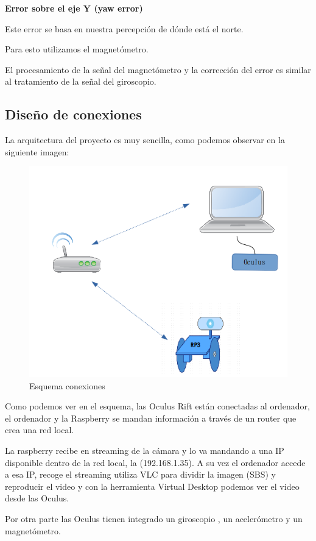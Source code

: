 \documentclass[twoside, 12pt]{epstfg}
\begin{document}
\newpage
\textbf{Error sobre el eje Y (yaw error)}

Este error se basa en nuestra percepción de dónde está el norte.

Para esto utilizamos el magnetómetro.

El procesamiento de la señal del magnetómetro y la corrección del error es similar al tratamiento de la señal del giroscopio.

\subsection{Diseño de conexiones}

La arquitectura del proyecto es muy sencilla, como podemos observar en la siguiente imagen:

\begin{figure}[h]
	\centerline{
		\mbox{\includegraphics[width=.80\textwidth]{images/EsquemaConexiones.png}}
	}
	\caption{Esquema conexiones}
\end{figure}


Como podemos ver en el esquema, las Oculus Rift están conectadas al ordenador, el ordenador y la Raspberry se mandan información a través de un router que crea una red local.

La raspberry recibe en streaming de la cámara y lo va mandando a una IP disponible dentro de la red local, la (192.168.1.35). A su vez el ordenador accede a esa IP, recoge el streaming utiliza VLC para dividir la imagen (SBS) y reproducir el video y con la herramienta Virtual Desktop podemos ver el video desde las Oculus.

Por otra parte las Oculus tienen integrado un giroscopio , un acelerómetro y un magnetómetro.
\end{document}
